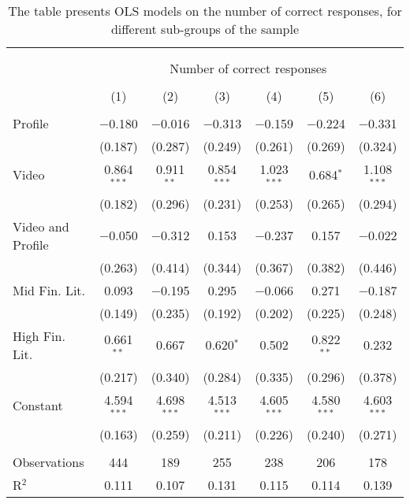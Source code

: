 
\begin{table}[H] \centering 
  \caption{The table presents OLS models on the number of correct responses, for different sub-groups of the sample} 
  \label{tbl:Main_results_correct_response} 
\begin{tabular}{@{\extracolsep{5pt}}lcccccc} 
\\[-1.8ex]\hline 
\hline \\[-1.8ex] 
\\[-1.8ex] & \multicolumn{6}{c}{Number of correct responses} \\ 
\\[-1.8ex] & (1) & (2) & (3) & (4) & (5) & (6)\\ 
\hline \\[-1.8ex] 
 Profile & $-$0.180 & $-$0.016 & $-$0.313 & $-$0.159 & $-$0.224 & $-$0.331 \\ 
  & (0.187) & (0.287) & (0.249) & (0.261) & (0.269) & (0.324) \\ 
  Video & 0.864$^{***}$ & 0.911$^{**}$ & 0.854$^{***}$ & 1.023$^{***}$ & 0.684$^{*}$ & 1.108$^{***}$ \\ 
  & (0.182) & (0.296) & (0.231) & (0.253) & (0.265) & (0.294) \\ 
  Video and Profile & $-$0.050 & $-$0.312 & 0.153 & $-$0.237 & 0.157 & $-$0.022 \\ 
  & (0.263) & (0.414) & (0.344) & (0.367) & (0.382) & (0.446) \\ 
  Mid Fin. Lit. & 0.093 & $-$0.195 & 0.295 & $-$0.066 & 0.271 & $-$0.187 \\ 
  & (0.149) & (0.235) & (0.192) & (0.202) & (0.225) & (0.248) \\ 
  High Fin. Lit. & 0.661$^{**}$ & 0.667 & 0.620$^{*}$ & 0.502 & 0.822$^{**}$ & 0.232 \\ 
  & (0.217) & (0.340) & (0.284) & (0.335) & (0.296) & (0.378) \\ 
  Constant & 4.594$^{***}$ & 4.698$^{***}$ & 4.513$^{***}$ & 4.605$^{***}$ & 4.580$^{***}$ & 4.603$^{***}$ \\ 
  & (0.163) & (0.259) & (0.211) & (0.226) & (0.240) & (0.271) \\ 
 \hline \\[-1.8ex] 
Observations & 444 & 189 & 255 & 238 & 206 & 178 \\ 
R$^{2}$ & 0.111 & 0.107 & 0.131 & 0.115 & 0.114 & 0.139 \\ 

\end{tabular}
\end{table}
